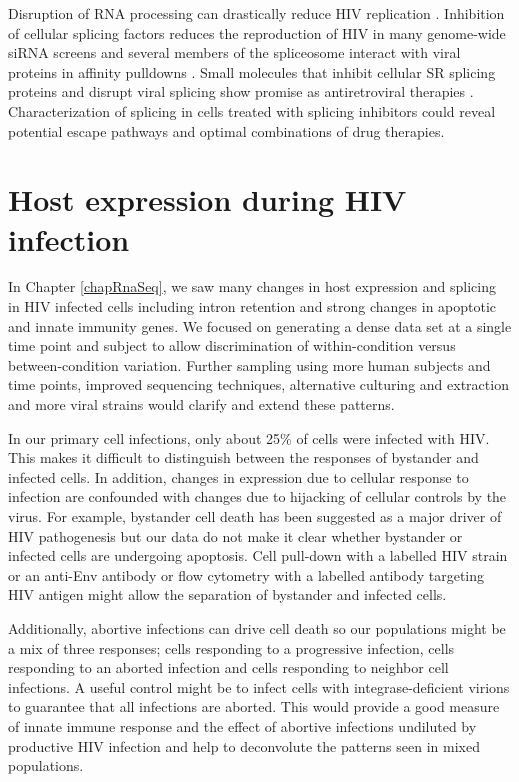 \documentclass[../sherrill-Mix_thesis.tex]{subfiles}
\begin{document}
	Disruption of RNA processing can drastically reduce HIV replication \citep{Wentz1997,Caputi2004,Madsen2005,Paca-Uccaralertkun2006,Mandal2008}. Inhibition of cellular splicing factors reduces the reproduction of HIV in many genome-wide siRNA screens \citep{Brass2008,Konig2008,Bushman2009} and several members of the spliceosome interact with viral proteins in affinity pulldowns \citep{Jager2012}. Small molecules that inhibit cellular SR splicing proteins and disrupt viral splicing show promise as antiretroviral therapies \citep{Fukuhara2006,Bakkour2007,Wong2011,Wong2013}. Characterization of splicing in cells treated with splicing inhibitors could reveal potential escape pathways and optimal combinations of drug therapies.


\section{Host expression during HIV infection} 
	In Chapter \ref{chapRnaSeq}, we saw many changes in host expression and splicing in HIV infected cells including intron retention and strong changes in apoptotic and innate immunity genes. We focused on generating a dense data set at a single time point and subject to allow discrimination of within-condition versus between-condition variation. Further sampling using more human subjects and time points, improved sequencing techniques, alternative culturing and extraction and more viral strains would clarify and extend these patterns.

	In our primary cell infections, only about 25\% of cells were infected with HIV. This makes it difficult to distinguish between the responses of bystander and infected cells. In addition, changes in expression due to cellular response to infection are confounded with changes due to hijacking of cellular controls by the virus. For example, bystander cell death has been suggested as a major driver of HIV pathogenesis \citep{Finkel1995,Doitsh2014} but our data do not make it clear whether bystander or infected cells are undergoing apoptosis. Cell pull-down with a labelled HIV strain \citep{Imbeault2009} or an anti-Env antibody \citep{Bahbouhi2004} or flow cytometry with a labelled antibody targeting HIV antigen \citep{Pace2012,Hrvatin2014} might allow the separation of bystander and infected cells. 

	Additionally, abortive infections can drive cell death \citep{Monroe2014,Doitsh2014} so our populations might be a mix of three responses; cells responding to a progressive infection, cells responding to an aborted infection and cells responding to neighbor cell infections. A useful control might be to infect cells with integrase-deficient virions to guarantee that all infections are aborted. This would provide a good measure of innate immune response and the effect of abortive infections undiluted by productive HIV infection and help to deconvolute the patterns seen in mixed populations.
\end{document}

